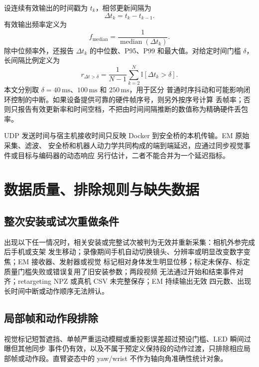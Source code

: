 设连续有效输出的时间戳为 $t_k$，相邻更新间隔为
\begin{equation}
  \Delta t_k=t_k-t_{k-1}.
  \label{eq:ch6_update_interval}
\end{equation}
有效输出频率定义为
\begin{equation}
  f_{\mathrm{median}}=
  \frac{1}{\operatorname{median}(\Delta t_k)}.
  \label{eq:ch6_median_update_rate}
\end{equation}
除中位频率外，还报告 $\Delta t_k$ 的中位数、P95、P99 和最大值。对给定时间门槛
$\delta$，长间隔比例定义为
\begin{equation}
  r_{\Delta t>\delta}=
  \frac{1}{N-1}\sum_{k=2}^{N}
  \mathbb{I}[\Delta t_k>\delta].
  \label{eq:ch6_long_interval_ratio}
\end{equation}
本文分别取 $\delta=40\,\mathrm{ms}$、$100\,\mathrm{ms}$ 和 $250\,\mathrm{ms}$，用于区分
普通时序抖动和可能影响闭环控制的中断。如果设备提供可靠的硬件帧序号，则另外按序号计算
丢帧率；否则只报告有效更新率和时间空档，不把由时间间隔推断的数值称为精确硬件丢包率。

UDP 发送时间与宿主机接收时间只反映 Docker 到安全桥的本机传输。EM 原始采集、滤波、
安全桥和机器人动力学共同构成的端到端延迟，应通过同步视觉事件或目标与编码器的动态响应
另行估计，二者不能合并为一个延迟指标。

\section{数据质量、排除规则与缺失数据}
\label{sec:ch6_exclusion_missing_data}

\subsection{整次安装或试次重做条件}
\label{subsec:ch6_whole_trial_exclusion}

出现以下任一情况时，相关安装或完整试次被判为无效并重新采集：相机外参完成后手机或支架
发生移动；录像期间手机自动切换镜头、分辨率或明显改变数字变焦；EM 接收器、发射器或视觉
标记相对身体发生明显位移；标定未保存、标定质量门槛失败或错误复用了旧安装参数；两段视频
无法通过开始和结束事件对齐；retargeting NPZ 或真机 CSV 未完整保存；EM 持续输出无效
四元数、出现长时间中断或动作顺序无法辨认。

\subsection{局部帧和动作段排除}
\label{subsec:ch6_local_frame_exclusion}

视觉标记短暂遮挡、单帧严重运动模糊或重投影误差超过预设门槛、LED 瞬间过曝但其他同步
事件仍有效，以及不属于预定义保持段的动作过渡，只排除相应局部帧或动作段。直臂姿态中的
yaw/wrist 不作为轴向角准确性统计对象。

